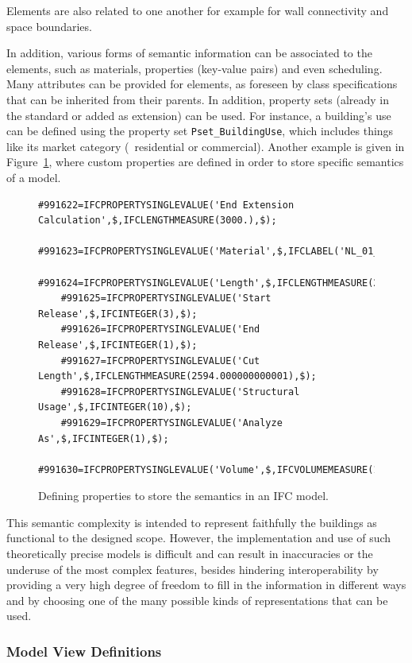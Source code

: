 Elements are also related to one another for example for wall connectivity and space boundaries.

In addition, various forms of semantic information can be associated to the elements, such as materials, properties (key-value pairs) and even scheduling.
Many attributes can be provided for elements, as foreseen by class specifications that can be inherited from their parents.
In addition, property sets (already in the standard or added as extension) can be used.
For instance, a building's use can be defined using the property set \texttt{Pset\_BuildingUse}, which includes things like its market category (\eg\ residential or commercial).
Another example is given in Figure~\ref{fig:pset}, where custom properties are defined in order to store specific semantics of a model.

\begin{figure}
	\begin{lstlisting}[frame=single]
	#991622=IFCPROPERTYSINGLEVALUE('End Extension Calculation',$,IFCLENGTHMEASURE(3000.),$);
	#991623=IFCPROPERTYSINGLEVALUE('Material',$,IFCLABEL('NL_01_hout_plaat'),$);
	#991624=IFCPROPERTYSINGLEVALUE('Length',$,IFCLENGTHMEASURE(2594.),$);
	#991625=IFCPROPERTYSINGLEVALUE('Start Release',$,IFCINTEGER(3),$);
	#991626=IFCPROPERTYSINGLEVALUE('End Release',$,IFCINTEGER(1),$);
	#991627=IFCPROPERTYSINGLEVALUE('Cut Length',$,IFCLENGTHMEASURE(2594.000000000001),$);
	#991628=IFCPROPERTYSINGLEVALUE('Structural Usage',$,IFCINTEGER(10),$);
	#991629=IFCPROPERTYSINGLEVALUE('Analyze As',$,IFCINTEGER(1),$);
	#991630=IFCPROPERTYSINGLEVALUE('Volume',$,IFCVOLUMEMEASURE(13602936.00000029),$);
\end{lstlisting}
	\caption{Defining properties to store the semantics in an IFC model.}%
	\label{fig:pset}
\end{figure}


This semantic complexity is intended to represent faithfully the buildings as functional to the designed scope.
However, the implementation and use of such theoretically precise models is difficult and can result in inaccuracies or the underuse of the most complex features, besides hindering interoperability by providing a very high degree of freedom to fill in the information in different ways and by choosing one of the many possible kinds of representations that can be used.


\subsubsection{Model View Definitions}

